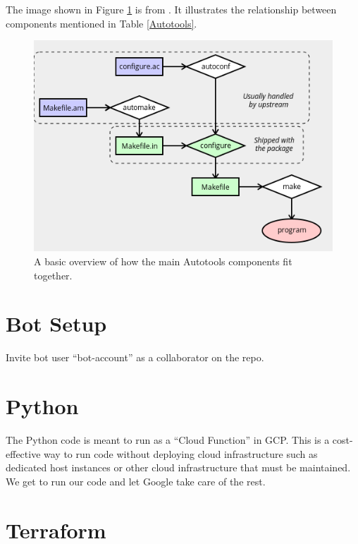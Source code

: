 \justifying
The image shown in Figure \ref{diagram} is from \cite{autobasics}.
It illustrates the relationship between components mentioned in Table \ref{Autotools}.
\vspace{2mm}

\begin{figure}[ht]
	\includegraphics[width=12cm]{images/diagram.png}
	\caption{A basic overview of how the main Autotools components fit together.}
	\label{diagram}
\end{figure}
\vspace{2mm}

\section{\label{sec:bot}Bot Setup}

Invite bot user ``bot-account'' as a collaborator on the repo.

\section{\label{sec:Python}Python}

\justifying
The Python code is meant to run as a ``Cloud Function'' in GCP. This is a cost-effective way to run code without deploying cloud infrastructure such as dedicated host instances or other cloud infrastructure that must be maintained. We get to run our code and let Google take care of the rest.

\section{\label{sec:Terraform}Terraform}


\clearpage
\begin{versionhistory}
\end{versionhistory}

\clearpage





